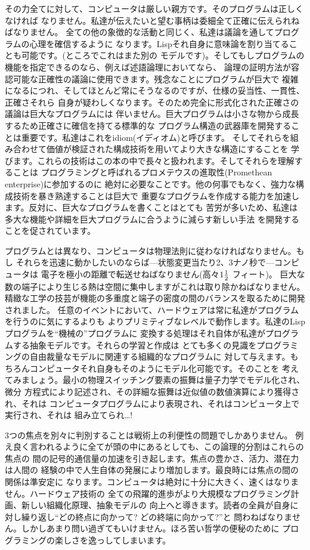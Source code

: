 \documentclass[oneside]{book}
\begin{document}
その力全てに対して、コンピュータは厳しい親方です。そのプログラムは正しくなければ
なりません。私達が伝えたいと望む事柄は委細全て正確に伝えられねばなりません。
全ての他の象徴的な活動と同じく、私達は議論を通してプログラムの心理を確信するように
なります。Lispそれ自身に意味論を割り当てることも可能です。(ところでこれはまた別の
モデルです)。そしてもしプログラムの機能を指定できるのなら、例えば述語論理においてなら、
論理の証明方法が容認可能な正確性の議論に使用できます。残念なことにプログラムが巨大で
複雑になるにつれ、そしてほとんど常にそうなるのですが、仕様の妥当性、一貫性、正確さそれら
自身が疑わしくなります。そのため完全に形式化された正確さの議論は巨大なプログラムには
伴いません。巨大プログラムは小さな物から成長するため正確さに確信を持てる標準的な
プログラム構造の武器庫を開発することは重要です。私達はこれをidiom(イディオム)と呼びます。
そしてそれらを組み合わせて価値が検証された構成技術を用いてより大きな構造にすることを
学びます。これらの技術はこの本の中で長々と扱われます。そしてそれらを理解することは
プログラミングと呼ばれるプロメテウスの進取性(Promethean enterprise)に参加するのに
絶対に必要なことです。他の何事でもなく、強力な構成技術を暴き熟達することは巨大で
重要なプログラムを作成する能力を加速します。反対に、巨大なプログラムを書くことはとても
苦労が多いため、私達は多大な機能や詳細を巨大プログラムに合うように減らす新しい手法
を開発することを促されています。



プログラムとは異なり、コンピュータは物理法則に従わなければなりません。もし
それらを迅速に動かしたいのならば---状態変更当たり2、3ナノ秒で---コンピュータは
電子を極小の距離で転送せねばなりません(高々\(1{1\over2}\) フィート)。
巨大な数の端子により生じる熱は空間に集中しますがこれは取り除かねばなりません。
精緻な工学の技芸が機能の多重度と端子の密度の間のバランスを取るために開発されました。
任意のイベントにおいて、ハードウェアは常に私達がプログラムを行うのに気にするよりも
よりプリミティブなレベルで動作します。私達のLispプログラムを``機械の''プログラムに
変換する処理はそれ自体が私達がプログラムする抽象モデルです。それらの学習と作成は
とても多くの見識をプログラミングの自由裁量なモデルに関連する組織的なプログラムに
対して与えます。もちろんコンピュータそれ自身もそのようにモデル化可能です。そのことを
考えてみましょう。最小の物理スイッチング要素の振舞は量子力学でモデル化され、微分
方程式により記述され、その詳細な振舞は近似値の数値演算により獲得され、それは
コンピュータプログラムにより表現され、それはコンピュータ上で実行され、それは
組み立てられ\dots !



3つの焦点を別々に判別することは戦術上の利便性の問題でしかありません。
例え良く言われるように全てが頭の中にあるとしても、この論理的分割はこれらの焦点の
間の記号的通信量の加速を引き起します。焦点の豊かさ、活力、潜在力は人間の
経験の中で人生自体の発展により増加します。最良時には焦点の間の関係は準安定に
なります。コンピュータは絶対に十分に大きく、速くはなりません。ハードウェア技術の
全ての飛躍的進歩がより大規模なプログラミング計画、新しい組織化原理、抽象モデルの
向上へと導きます。読者の全員が自身に対し繰り返し``どの終点に向かって? どの終端に向かって?''と
問わねばなりません。しかしあまり問い過ぎてもいけません。ほろ苦い哲学の便秘のために
プログラミングの楽しさを逸っしてしまいます。
\end{document}
